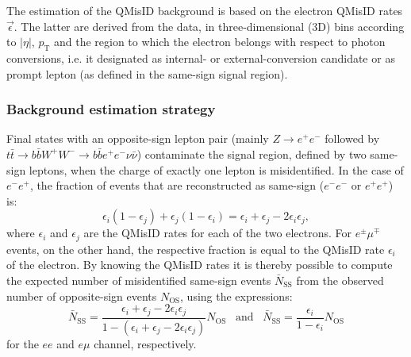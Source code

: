 The estimation of the QMisID background is based on the electron QMisID rates $\vec{\epsilon}$. The latter 
are derived from the data, in three-dimensional (3D) bins according to $|\eta|$, $p_{\mathrm T}$ and the 
region to which the electron belongs with respect to photon conversions, i.e. it designated as internal- 
or external-conversion candidate or as prompt lepton (as defined in the
same-sign signal region).



\subsubsection{Background estimation strategy} 
Final states with an opposite-sign lepton pair (mainly $Z \rightarrow e^+e^- $
followed by $t\bar{t} \rightarrow b\bar{b}W^+W^- \rightarrow b\bar{b}e^+e^-\nu\bar{\nu}$)
contaminate the signal region, defined by two same-sign leptons, when the charge of exactly one lepton
is misidentified. In the case of $e^{-}e^{+}$, the fraction of events that are reconstructed as same-sign 
($e^{-}e^{-}$ or $e^{+}e^{+}$) is:
%
\begin{equation}
  \epsilon_i(1-\epsilon_j) + \epsilon_j(1-\epsilon_i) = \epsilon_i +\epsilon_j - 2\epsilon_i\epsilon_j, 
\end{equation}
%
where $\epsilon_i$ and $\epsilon_j$ are the QMisID rates for each of the two electrons. For $e^{\pm}\mu^{\mp}$ 
events, on the other hand, the respective fraction is equal to the QMisID rate $\epsilon_i$ of the electron. 
By knowing the QMisID rates it is thereby possible to compute the expected number of misidentified same-sign 
events $\bar{N}_\mathrm{SS}$ from the observed number of opposite-sign events $N_\mathrm{OS}$, using the expressions:
%
\begin{equation}
  \bar{N}_\mathrm{SS} = \frac{\epsilon_i +\epsilon_j -2\epsilon_i \epsilon_j}{1-(\epsilon_i +\epsilon_j -2\epsilon_i \epsilon_j)} N_\mathrm{OS}
  \hspace{10pt}\text{and}\hspace{10pt}
  \bar{N}_\mathrm{SS} = \frac{\epsilon_i}{1-\epsilon_i} N_\mathrm{OS}
\end{equation}
%
for the $ee$ and $e\mu$ channel, respectively.

